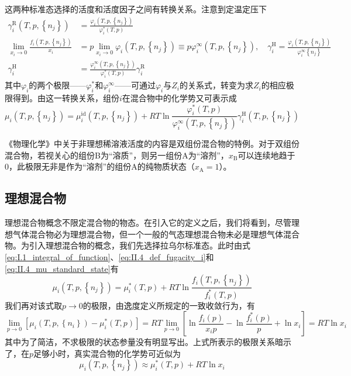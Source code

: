 \documentclass[main.tex]{subfiles}
\begin{document}
这两种标准态选择的活度和活度因子之间有转换关系。注意到定温定压下
\begin{align*}
  \gamma_i^\text{R}\left(T,p,\left\{n_j\right\}\right)              & =\frac{\varphi_i\left(T,p,\left\{n_j\right\}\right)}{\varphi_i^*\left(T,p\right)}                                                                                                                                                       \\
  \lim_{x_i\to 0}\frac{f_i\left(T,p,\left\{n_j\right\}\right)}{x_i} & =p\lim_{x_i\to 0}\varphi_i\left(T,p,\left\{n_j\right\}\right)\equiv p\varphi_i^\infty\left(T,p,\left\{n_j\right\}\right),\quad\gamma_i^\text{H}=\frac{\varphi_i\left(T,p,\left\{n_j\right\}\right)}{\varphi_i^\infty\left\{n_j\right\}} \\
  \gamma_i^\text{H}                                                 & =\frac{\varphi_i^\infty\left(T,p,\left\{n_j\right\}\right)}{\varphi_i^*\left(T,p\right)}\gamma_i^\text{R}
\end{align*}
其中$\varphi_i$的两个极限——$\varphi_i^*$和$\varphi_i^\infty$——可通过$\varphi_i$与$Z_i$的关系式，转变为求$Z_i$的相应极限得到。由这一转换关系，组份$i$在混合物中的化学势又可表示成
\begin{equation}\label{eq:II.4_Henry_standardstate_activity_factor}
  \mu_i\left(T,p,\left\{n_j\right\}\right)=\mu_i^\text{id}\left(T,p,\left\{n_j\right\}\right)+RT\ln\frac{\varphi_i^*\left(T,p\right)}{\varphi_i^\infty\left(T,p,\left\{n_j\right\}\right)}\gamma_i^\text{H}\left(T,p,\left\{n_j\right\}\right)
\end{equation}

《物理化学》中关于非理想稀溶液活度的内容是双组份混合物的特例。对于双组份混合物，若视关心的组份B为“溶质”，则另一组份A为“溶剂”，$x_\text{B}$可以连续地趋于0，此极限无非是作为“溶剂”的组份A的纯物质状态（$x_\text{A}=1$）。

\subsection{理想混合物}
理想混合物概念不限定混合物的物态。在引入它的定义之后，我们将看到，尽管理想气体混合物必为理想混合物，但一个一般的气态理想混合物未必是理想气体混合物。为引入理想混合物的概念，我们先选择拉乌尔标准态。此时由式\eqref{eq:I.1_integral_of_function}、\eqref{eq:II.4_def_fugacity_i}和\eqref{eq:II.4_mu_standard_state}有
\[\mu_i\left(T,p,\left\{n_j\right\}\right)=\mu_i^*\left(T,p\right)+RT\ln\frac{f_i\left(T,p,\left\{n_j\right\}\right)}{f_i^*\left(T,p\right)}\]
我们再对该式取$p\rightarrow 0$的极限，由逸度定义所规定的一致收敛行为，有
\[\lim_{p\to 0}\left[\mu_i\left(T,p,\left\{n_i\right\}\right)-\mu_i^*\left(T,p\right)\right]=RT\lim_{p\to 0}\left[\ln\frac{f_i\left(p\right)}{x_ip}-\ln\frac{f_i^*\left(p\right)}{p}+\ln x_i\right]=RT\ln x_i\]
其中为了简洁，不求极限的状态参量没有明显写出。上式所表示的极限关系暗示了，在$p$足够小时，真实混合物的化学势可近似为
\[\mu_i\left(T,p,\left\{n_j\right\}\right)\approx\mu_i^*\left(T,p\right)+RT\ln x_i\]
\end{document}
